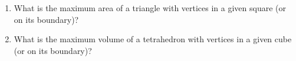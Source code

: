 \begin{enumerate}[label = (\alph*)]
	\item What is the maximum area of a triangle with vertices in a given square (or on its boundary)?
	\item What is the maximum volume of a tetrahedron with vertices in a given cube (or on its boundary)?
\end{enumerate}
